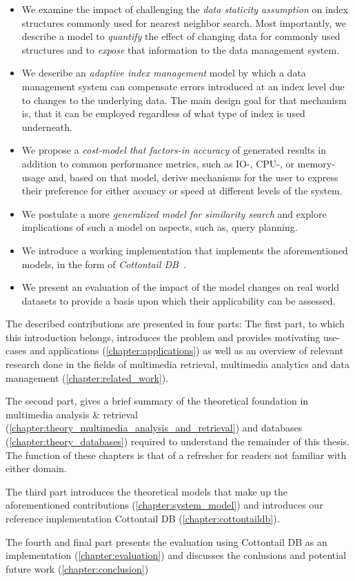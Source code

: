 \begin{itemize}
    \item We examine the impact of challenging the \emph{data staticity assumption} on index structures commonly used for nearest neighbor search. Most importantly, we describe a model to \emph{quantify} the effect of changing data for commonly used structures and to \emph{expose} that information to the data management system.
    \item We describe an \emph{adaptive index management} model by which a data management system can compensate errors introduced at an index level due to changes to the underlying data. The main design goal for that mechanism is, that it can be employed regardless of what type of index is used underneath.
    \item We propose a \emph{cost-model that factors-in accuracy} of generated results in addition to common performance metrics, such as IO-, CPU-, or memory-usage and, based on that model, derive mechanisms for the user to express their preference for either accuacy or speed at different levels of the system.
    \item We postulate a more \emph{generalized model for similarity search} and explore implications of such a model on aspects, such as, query planning.
    \item We introduce a working implementation that implements the aforementioned models, in the form of \emph{Cottontail DB}~\cite{Gasser:2020cottontail}.
    \item We present an evaluation of the impact of the model changes on real world datasets to provide a basis upon which their applicability can be assessed.
\end{itemize}

The described contributions are presented in four parts: The first part, to which this introduction belongs, introduces the problem and provides motivating use-cases and applications (\cref{chapter:applications}) as well as an overview of relevant research done in the fields of multimedia retrieval, multimedia analytics and data management (\cref{chapter:related_work}).

The second part, gives a brief summary of the theoretical foundation in multimedia analysis \& retrieval (\cref{chapter:theory_multimedia_analysis_and_retrieval}) and databases (\cref{chapter:theory_databases}) required to understand the remainder of this thesis. The function of these chapters is that of a refresher for readers not familiar with either domain.

The third part introduces the theoretical models that make up the aforementioned contributions (\cref{chapter:system_model}) and introduces our reference implementation Cottontail DB (\cref{chapter:cottontaildb}).

The fourth and final part presents the evaluation using Cottontail DB as an implementation (\cref{chapter:evaluation}) and discusses the conlusions and potential future work (\cref{chapter:conclusion})